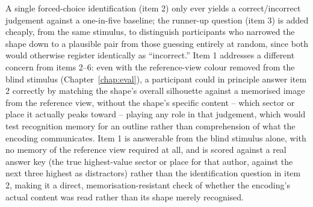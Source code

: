 \documentclass[logo,msc]{infthesis}
\begin{document}
A single forced-choice identification (item 2) only ever yields a correct/incorrect judgement against a one-in-five baseline; the runner-up question (item 3) is added cheaply, from the same stimulus, to distinguish participants who narrowed the shape down to a plausible pair from those guessing entirely at random, since both would otherwise register identically as ``incorrect.'' Item 1 addresses a different concern from items 2--6: even with the reference-view colour removed from the blind stimulus (Chapter~\ref{chap:eval}), a participant could in principle answer item 2 correctly by matching the shape's overall silhouette against a memorised image from the reference view, without the shape's specific content -- which sector or place it actually peaks toward -- playing any role in that judgement, which would test recognition memory for an outline rather than comprehension of what the encoding communicates. Item 1 is answerable from the blind stimulus alone, with no memory of the reference view required at all, and is scored against a real answer key (the true highest-value sector or place for that author, against the next three highest as distractors) rather than the identification question in item 2, making it a direct, memorisation-resistant check of whether the encoding's actual content was read rather than its shape merely recognised.
\end{document}
